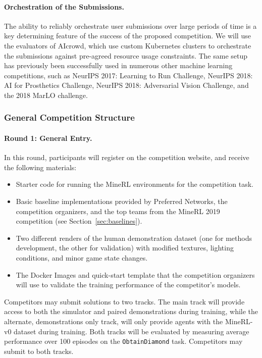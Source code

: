 \paragraph{Orchestration of the Submissions.}
The ability to reliably orchestrate user submissions over large periods of time is a key determining feature of the success of the proposed competition. 
We will use the evaluators of AIcrowd, which use custom Kubernetes clusters to orchestrate the submissions against pre-agreed resource usage constraints. 
The same setup has previously been successfully used in numerous other machine learning competitions, such as NeurIPS 2017: Learning to Run Challenge, NeurIPS 2018: AI for Prosthetics Challenge, NeurIPS 2018: Adversarial Vision Challenge, and the 2018 MarLO challenge. 



\subsubsection{General Competition Structure}

\paragraph{Round 1: General Entry.} 
In this round, participants will register on the competition website, and receive the following materials:
\begin{itemize}
	\item Starter code for running the MineRL environments for the competition task. 
	\item Basic baseline implementations provided by Preferred Networks, the competition organizers, and the top teams from the MineRL 2019 competition (see Section~\ref{sec:baselines}).
	\item Two different renders of the human demonstration dataset (one for methods development, the other for validation) with modified textures, lighting conditions, and minor game state changes. 
	\item The Docker Images and quick-start template that the competition organizers will use to validate the training performance of the competitor's models.
\end{itemize}

Competitors may submit solutions to two tracks. The main track will provide access to both the simulator and paired demonstrations during training, while the alternate, demonstrations only track, will only provide agents with the MineRL-v0 dataset during training. Both tracks will be evaluated by measuring average performance over 100 episodes on the \texttt{ObtainDiamond} task. Competitors may submit to both tracks.

